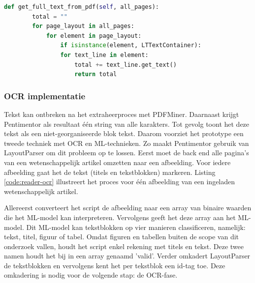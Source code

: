 \begin{lstlisting}[language=Python, caption={Een PDF inlezen met PDFMiner}, label={code:inlezen-van-pdf}]
	def get_full_text_from_pdf(self, all_pages):
		total = ""
		for page_layout in all_pages:
			for element in page_layout:
				if isinstance(element, LTTextContainer):
				for text_line in element:
					total += text_line.get_text()
					return total
\end{lstlisting}

\subsubsection{OCR implementatie}

Tekst kan ontbreken na het extraheerproces met PDFMiner. Daarnaast krijgt Pentimentor als resultaat één string van alle karakters. Tot gevolg toont het deze tekst als een niet-georganiseerde blok tekst. Daarom voorziet het prototype een tweede techniek met OCR en ML-technieken. Zo maakt Pentimentor gebruik van LayoutParser om dit probleem op te lossen. Eerst moet de back end alle pagina's van een wetenschappelijk artikel omzetten naar een afbeelding. Voor iedere afbeelding gaat het de tekst (titels en tekstblokken) markeren. Listing \ref{code:reader-ocr} illustreert het proces voor één afbeelding van een ingeladen wetenschappelijk artikel. 

\medspace

Allereerst converteert het script de afbeelding naar een array van binaire waarden die het ML-model kan interpreteren. Vervolgens geeft het deze array aan het ML-model. Dit ML-model kan tekstblokken op vier manieren classificeren, namelijk: tekst, titel, figuur of tabel. Omdat figuren en tabellen buiten de scope van dit onderzoek vallen, houdt het script enkel rekening met titels en tekst. Deze twee namen houdt het bij in een array genaamd 'valid'. Verder omkadert LayoutParser de tekstblokken en vervolgens kent het per tekstblok een id-tag toe. Deze omkadering is nodig voor de volgende stap: de OCR-fase.

